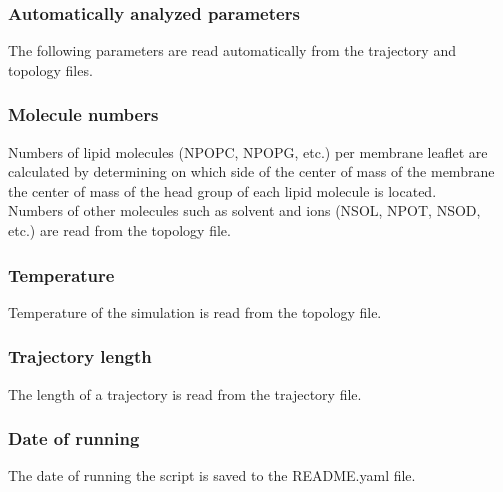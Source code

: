 \documentclass[fleqn,10pt]{wlscirep}
\begin{document}
\subsubsection{Automatically analyzed parameters}
The following parameters are read automatically from the trajectory and topology files.
\subsubsection*{Molecule numbers}
Numbers of lipid molecules (NPOPC, NPOPG, etc.) per membrane leaflet are calculated by determining on which side of the center of mass of the membrane the center of mass of the head group of each lipid molecule is located.
\newline \\
\noindent Numbers of other molecules such as solvent and ions (NSOL, NPOT, NSOD, etc.) are read from the topology file.

\subsubsection*{Temperature}
Temperature of the simulation is read from the topology file.

\subsubsection*{Trajectory length}
The length of a trajectory is read from the trajectory file.

\subsubsection*{Date of running}
The date of running the script is saved to the README.yaml file.






\end{document}
